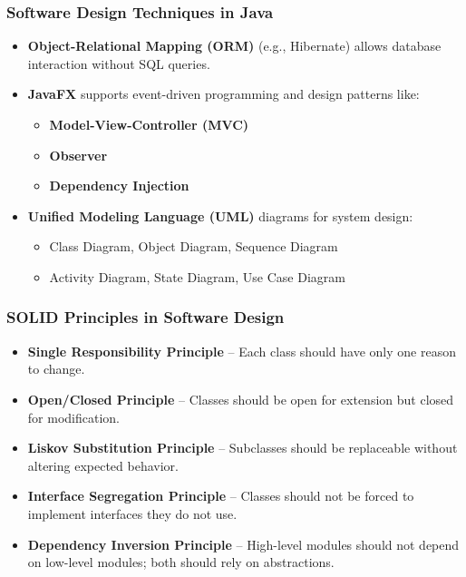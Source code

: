 \documentclass[aspectratio=169, table]{beamer}
\begin{document}
\begin{frame}[fragile]
	\frametitle{Software Design Techniques in Java}
	
	\begin{itemize}
		\item \textbf{Object-Relational Mapping (ORM)} (e.g., Hibernate) allows database interaction without SQL queries.
		\item \textbf{JavaFX} supports event-driven programming and design patterns like:
		\begin{itemize}
			\item \textbf{Model-View-Controller (MVC)}
			\item \textbf{Observer}
			\item \textbf{Dependency Injection}
		\end{itemize}
		\item \textbf{Unified Modeling Language (UML)} diagrams for system design:
		\begin{itemize}
			\item Class Diagram, Object Diagram, Sequence Diagram
			\item Activity Diagram, State Diagram, Use Case Diagram
		\end{itemize}
	\end{itemize}
\end{frame}

\begin{frame}[fragile]
	\frametitle{SOLID Principles in Software Design}
	
	\begin{itemize}
		\item \textbf{Single Responsibility Principle} – Each class should have only one reason to change.
		\item \textbf{Open/Closed Principle} – Classes should be open for extension but closed for modification.
		\item \textbf{Liskov Substitution Principle} – Subclasses should be replaceable without altering expected behavior.
		\item \textbf{Interface Segregation Principle} – Classes should not be forced to implement interfaces they do not use.
		\item \textbf{Dependency Inversion Principle} – High-level modules should not depend on low-level modules; both should rely on abstractions.
	\end{itemize}
\end{frame}
\end{document}

